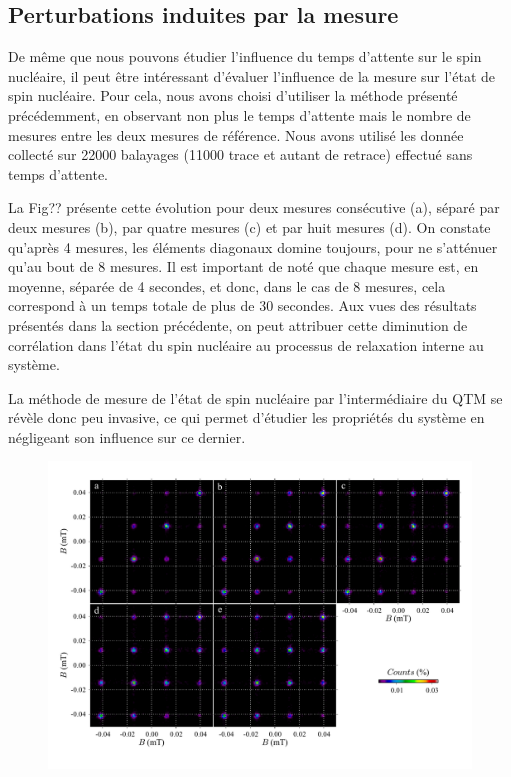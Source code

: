 \subsection{Perturbations induites par la mesure}
De m\^eme que nous pouvons étudier l'influence du temps d'attente sur le spin nucléaire, il peut \^etre intéressant d'évaluer l'influence de la mesure sur l'état de spin nucléaire. Pour cela, nous avons choisi d'utiliser la méthode présenté précédemment, en observant non plus le temps d'attente mais le nombre de mesures entre les deux mesures de référence. Nous avons utilisé les donnée collecté sur 22000 balayages (11000 trace et autant de retrace) effectué sans temps d'attente.

La Fig?? présente cette évolution pour deux mesures consécutive (a), séparé par deux mesures (b), par quatre mesures (c) et par huit mesures (d). On constate qu'après 4 mesures, les éléments diagonaux domine toujours, pour ne s'atténuer qu'au bout de 8 mesures. Il est important de noté que chaque mesure est, en moyenne, séparée de 4 secondes, et donc, dans le cas de 8 mesures, cela correspond à un temps totale de plus de 30 secondes. Aux vues des résultats présentés dans la section précédente, on peut attribuer cette diminution de corrélation dans l'état du spin nucléaire au processus de relaxation interne au système. 

La méthode de mesure de l'état de spin nucléaire par l'intermédiaire du QTM se révèle donc peu invasive, ce qui permet d'étudier les propriétés du système en négligeant son influence sur ce dernier.

\begin{figure}
\includegraphics[scale=0.45]{Resultats/Chap2/Figure3/figure3.pdf} 
\caption{}
\label{evolution_mesures}
\end{figure}


